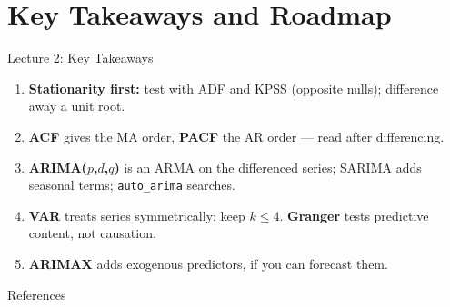 \documentclass[aspectratio=169, 11pt]{beamer}
\begin{document}
\section{Key Takeaways and Roadmap}


\begin{frame}{Lecture 2: Key Takeaways}
  \begin{keybox}
    {\small
    \begin{enumerate}
      \item \textbf{Stationarity first:} test with ADF and KPSS (opposite nulls); difference
            away a unit root.
      \item \textbf{ACF} gives the MA order, \textbf{PACF} the AR order --- read after
            differencing.
      \item \textbf{ARIMA($p$,$d$,$q$)} is an ARMA on the differenced series; SARIMA adds
            seasonal terms; \texttt{auto\_arima} searches.
      \item \textbf{VAR} treats series symmetrically; keep $k \leq 4$. \textbf{Granger} tests
            predictive content, not causation.
      \item \textbf{ARIMAX} adds exogenous predictors, if you can forecast them.
    \end{enumerate}
    }
  \end{keybox}
\end{frame}

\begin{frame}[allowframebreaks]{References}
  \printbibliography[heading=none]
\end{frame}

\end{document}
